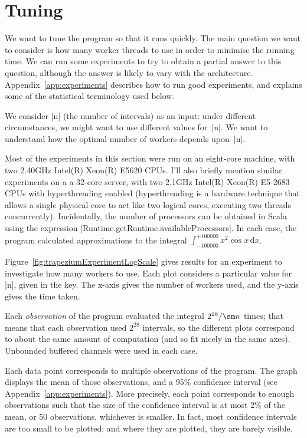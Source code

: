\section{Tuning}
\label{sec:trapezium-tuning}

We want to tune the program so that it runs quickly.  The main
question we want to consider is how many worker threads to use in order to
minimise the running time.
We can run some experiments to try to obtain  a partial answer to
this question, although the answer is likely to vary with the architecture.
%
Appendix~\ref{app:experiments} describes how to run good experiments, and
explains some of the statistical terminology used below. 

We consider |n| (the number of intervals) as an input: under different
circumstances, we might want to use different values for~|n|.  We want to
understand how the optimal number of workers depends upon~|n|.

Most of the experiments in this section were run on an eight-core machine, with
two 2.40GHz Intel(R) Xeon(R) E5620 CPUs.
%
I'll also briefly mention similar experiments on a a 32-core server, with two
2.1GHz Intel(R) Xeon(R) E5-2683 CPUs with hyperthreading
enabled (hyperthreading is a hardware technique that allows a single physical
core to act like two logical cores, executing two threads concurrently).
%
Incidentally, the number of processors can be obtained in Scala
using the expression |Runtime.getRuntime.availableProcessors|.
%
In each case, the program calculated approximations to the integral 
$\int_{-100000}^{+100000} x^2 \cos x \, \mbox{d}x$.


Figure~\ref{fig:trapeziumExperimentLogScale} gives results for an experiment
to investigate how many workers to use.  
%
Each plot considers a particular value for |n|, given in the key.
%
The x-axis gives the number of workers used, and the y-axis gives the time
taken.  

Each \emph{observation} of the program evaluated the
integral $2^{28}/\sm n$ times; that means that each observation used $2^{28}$
intervals, so the different plots correspond to about the same amount of
computation (and so fit nicely in the same axes).  Unbounded buffered channels
were used in each case.

Each data point corresponds to multiple observations of the program.  The
graph displays the mean of those observations, and a 95\% confidence interval
(see Appendix~\ref{app:experiments}).  More precisely, each point corresponds
to enough observations such that the size of the confidence interval is at
most 2\% of the mean, or 50 observations, whichever is smaller.  In fact, most
confidence intervals are too small to be plotted; and where they are plotted,
they are barely visible.

